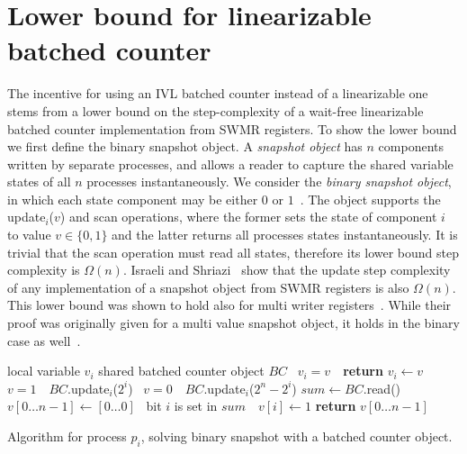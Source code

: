 \section{Lower bound for linearizable batched counter}
\label{ivl-ssec:lower-bound}

The incentive for using an IVL batched counter instead of a linearizable one stems
from a lower bound on the step-complexity of a wait-free linearizable batched counter implementation from SWMR registers.
To show the lower bound we first define the binary snapshot object.
A \emph{snapshot object} has $n$ components written by separate processes, and allows a reader to
capture the shared variable states of all $n$ processes instantaneously. We
consider the \emph{binary snapshot object}, in which each state component may be either $0$ or $1$~\cite{hoepman1993binary}. The object
supports the {\sc update}$_i$($v$) and {\sc scan} operations, where the former sets the state of component $i$
to value $v \in \{0,1\}$ and the latter returns all processes states instantaneously.
It is trivial that the {\sc scan} operation must read all states, therefore its lower bound step complexity
is $\Omega(n)$. Israeli and Shriazi~\cite{israeli1998time} show that the {\sc update} step complexity
of any implementation of a snapshot object from SWMR registers is also $\Omega(n)$. This lower bound
was shown to hold also for multi writer registers~\cite{attiya2006complexity}. While
their proof was originally given for a multi value snapshot object, it holds in the binary case as well~\cite{hoepman1993binary}.

\begin{algorithm}
    \begin{algorithmic}[1]

        \State local variable $v_i$ 
        \State shared batched counter object $\mathit{BC}$ 
        \Statex
        \State \algorithmicif\ $v_i = v$\ \algorithmicthen\ \textbf{return} \label{ivl-l:skip}
        \State $v_i \gets v$
        \State \algorithmicif\ $v = 1$\ \algorithmicthen\ $\mathit{BC}$.{\sc update}$_i$($2^i$) \label{ivl-l:set-1}
        \State \algorithmicif\ $v = 0$\ \algorithmicthen\ $\mathit{BC}$.{\sc update}$_i$($2^n - 2^i$) \label{ivl-l:set-0}
        \EndProcedure
        \State $\mathit{sum} \gets \mathit{BC}$.{\sc read}() \label{ivl-l:read} %
        \State $v[0 \dots n-1] \gets [0 \dots 0]$ 
        \State \algorithmicif\ bit $i$ is set in $\mathit{sum}$\ \algorithmicthen\ $v[i] \gets 1$ \label{ivl-l:check-set}
        \EndFor
        \State \textbf{return} $v[0 \dots n-1]$
        \EndProcedure
    \end{algorithmic}
    \caption{Algorithm for process $p_i$, solving binary snapshot with a batched counter object.}
    \label{ivl-alg:bs-with-adder}
\end{algorithm}

